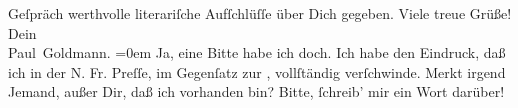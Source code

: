 \begin{ledgroupsized}[t]{13cm}
               Geſpräch werthvolle literariſche Aufſchlüſſe über Dich gegeben.\pend
           \pstart
           Viele treue Grüße! {\\[\baselineskip]}Dein {\\[\baselineskip]}\spacefill\mbox{Paul Goldmann.}\pend
           \leftskip=0em{}\pstart
           \noindent{}Ja, eine Bitte habe ich doch. Ich habe den Eindruck, daß ich in der N. Fr. Preſſe, im Gegenſatz zur \label{K_L02905-57v}\label{K_L02905-57h}, vollſtändig verſchwinde. Merkt irgend Jemand, außer
                  Dir, daß ich vorhanden bin? Bitte, ſchreib’ mir ein Wort darüber!\pend
           
         
         \endnumbering{}\end{ledgroupsized}\begin{anhang}\end{anhang}\newcommand{\dateiname}{L02905}\newcommand{\titel}{Paul Goldmann an Arthur Schnitzler, 20. 2. 1900}\newcommand{\editorInnen}{Martin Anton Müller und Laura Untner}
      